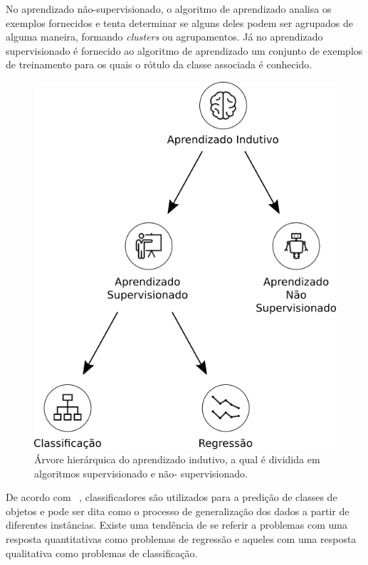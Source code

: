 No aprendizado não-supervisionado, o algoritmo de aprendizado analisa os exemplos fornecidos e tenta determinar se alguns deles podem ser agrupados de alguma maneira, formando \textit{clusters} ou agrupamentos. Já no aprendizado supervisionado é fornecido ao algoritmo de aprendizado um conjunto de exemplos de treinamento para os quais o rótulo da classe associada é conhecido.

\begin{figure}[H]
\begin{center}
    \includegraphics[scale=0.75]{images/aprendizado_indutivo.png}
\end{center}
\caption{Árvore hierárquica do aprendizado indutivo, a qual é dividida em algoritmos supervisionado e não- supervisionado.}
\label{fig:aprendizado_indutivo}
\end{figure}

De acordo com ~\cite{porthos_motta:2016}, classificadores são utilizados para a predição de classes de objetos e pode ser dita como o processo de generalização dos dados a partir de diferentes instâncias. Existe uma tendência de se referir a problemas com uma resposta quantitativas como problemas de regressão e aqueles com uma resposta qualitativa como problemas de classificação.

